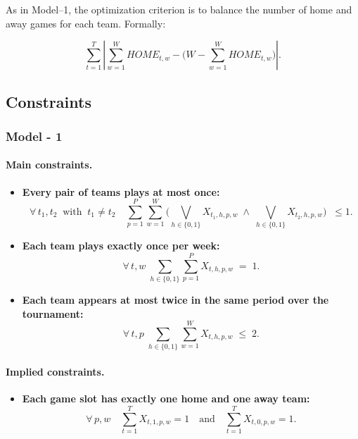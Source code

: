 As in Model--1, the optimization criterion is to balance the number of
home and away games for each team. Formally:

\[
\sum_{t=1}^T \left| \sum_{w=1}^W HOME_{t,w}
      - \Big(W - \sum_{w=1}^W HOME_{t,w}\Big) \right|.
\]

\subsection{Constraints}

\subsubsection{Model - 1 }

\paragraph{Main constraints.}

\begin{itemize}
\item[(C1)] \textbf{Every pair of teams plays at most once:}  
\[
\forall\, t_1,t_2 \;\;\text{with}\;\;t_1\neq t_2\quad
\sum_{p=1}^{P}\sum_{w=1}^{W}
\Big( \bigvee_{h\in\{0,1\}} X_{t_1,h,p,w} \;\land\;
       \bigvee_{h\in\{0,1\}} X_{t_2,h,p,w} \Big)
\;\;\leq 1.
\]

\item[(C2)] \textbf{Each team plays exactly once per week:}  
\[
\forall \,t, w\;
\sum_{h\in\{0,1\}}\sum_{p=1}^{P} X_{t,h,p,w} \;=\; 1.
\]

\item[(C3)] \textbf{Each team appears at most twice in the same period over the tournament:}  
\[
\forall\, t, p\;
\sum_{h\in\{0,1\}}\sum_{w=1}^{W} X_{t,h,p,w} \;\leq\; 2.
\]
\end{itemize}

\paragraph{Implied constraints.}

\begin{itemize}
\item[(C4)] \textbf{Each game slot has exactly one home and one away team:}  
\[
\forall\, p, w\quad
\sum_{t=1}^{T} X_{t,1,p,w} = 1
\quad\text{and}\quad
\sum_{t=1}^{T} X_{t,0,p,w} = 1.
\]
\end{itemize}

